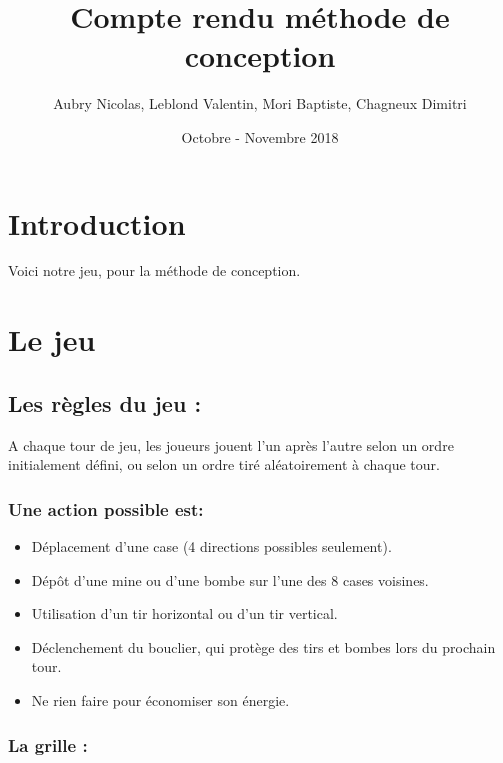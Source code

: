 \documentclass{article}
\title{Compte rendu méthode de conception}
\author{Aubry Nicolas, Leblond Valentin, Mori Baptiste, Chagneux Dimitri}
\date{Octobre - Novembre 2018}
\begin{document}
\maketitle

\section{Introduction}
Voici notre jeu, pour la méthode de conception.

\section{Le jeu }

\subsection{Les règles du jeu : }

A chaque tour de jeu, les joueurs jouent l'un après l'autre selon un ordre initialement défini, ou selon
un ordre tiré aléatoirement à chaque tour.

\vspace{1\baselineskip}

\subsubsection{Une action possible est:}

\vspace{1\baselineskip}

\begin{itemize}
    \item  Déplacement d'une case (4 directions possibles seulement).
    \item  Dépôt d'une mine ou d'une bombe sur l'une des 8 cases voisines.
    \item  Utilisation d'un tir horizontal ou d'un tir vertical.
    \item  Déclenchement du bouclier, qui protège des tirs et bombes lors du prochain tour.
    \item  Ne rien faire pour économiser son énergie.
\end{itemize}
	
\vspace{1\baselineskip}

\subsubsection{La grille :}
\end{document}
